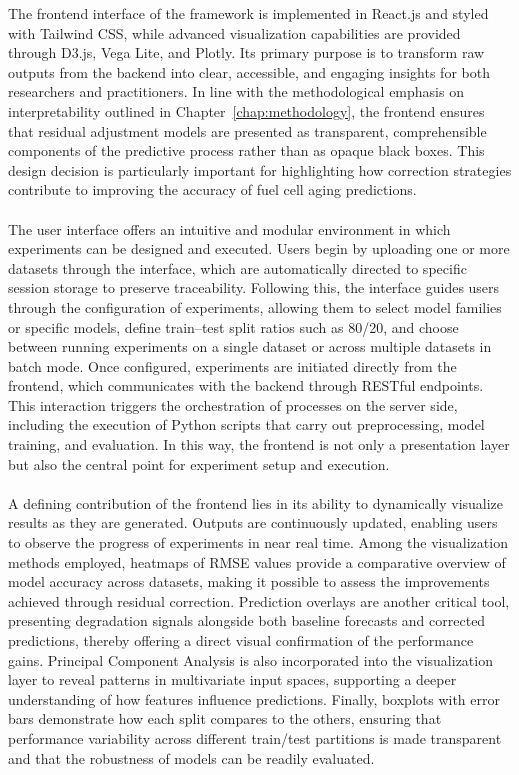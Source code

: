 The frontend interface of the framework is implemented in React.js and styled with Tailwind CSS, while advanced visualization capabilities are provided through D3.js, Vega Lite, and Plotly. Its primary purpose is to transform raw outputs from the backend into clear, accessible, and engaging insights for both researchers and practitioners. In line with the methodological emphasis on interpretability outlined in Chapter~\ref{chap:methodology}, the frontend ensures that residual adjustment models are presented as transparent, comprehensible components of the predictive process rather than as opaque black boxes. This design decision is particularly important for highlighting how correction strategies contribute to improving the accuracy of fuel cell aging predictions.
\\\\The user interface offers an intuitive and modular environment in which experiments can be designed and executed. Users begin by uploading one or more datasets through the interface, which are automatically directed to specific session storage to preserve traceability. Following this, the interface guides users through the configuration of experiments, allowing them to select model families or specific models, define train–test split ratios such as 80/20, and choose between running experiments on a single dataset or across multiple datasets in batch mode. Once configured, experiments are initiated directly from the frontend, which communicates with the backend through RESTful endpoints. This interaction triggers the orchestration of processes on the server side, including the execution of Python scripts that carry out preprocessing, model training, and evaluation. In this way, the frontend is not only a presentation layer but also the central point for experiment setup and execution.
\\\\A defining contribution of the frontend lies in its ability to dynamically visualize results as they are generated. Outputs are continuously updated, enabling users to observe the progress of experiments in near real time. Among the visualization methods employed, heatmaps of RMSE values provide a comparative overview of model accuracy across datasets, making it possible to assess the improvements achieved through residual correction. Prediction overlays are another critical tool, presenting degradation signals alongside both baseline forecasts and corrected predictions, thereby offering a direct visual confirmation of the performance gains. Principal Component Analysis is also incorporated into the visualization layer to reveal patterns in multivariate input spaces, supporting a deeper understanding of how features influence predictions. Finally, boxplots with error bars demonstrate how each split compares to the others, ensuring that performance variability across different train/test partitions is made transparent and that the robustness of models can be readily evaluated.
